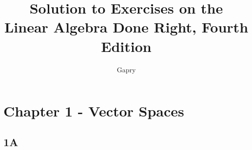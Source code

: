 \documentclass{article}
\title{Solution to Exercises on the \\Linear Algebra Done Right, Fourth Edition}
\author{Gapry}
\begin{document}
\maketitle

\section*{Chapter 1 - Vector Spaces}

\subsection*{1A}




\end{document}

